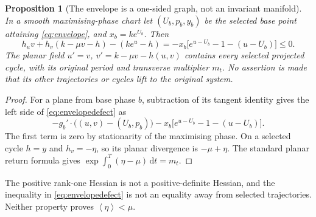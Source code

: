 \documentclass[11pt,a4paper]{article}
\numberwithin{equation}{section}
\newtheorem{proposition}[theorem]{Proposition}
\theoremstyle{remark}\newtheorem{remark}[theorem]{Remark}
\newcommand{\avg}[1]{\left\langle #1\right\rangle}
\newcommand{\dd}{\,\mathrm dt}
\begin{document}
\begin{proposition}[The envelope is a one-sided graph, not an invariant manifold]\label{prop:envelopedefect}
In a smooth maximising-phase chart let $(U_b,p_b,y_b)$ be the selected base point attaining \eqref{eq:envelope}, and $x_b=ke^{U_b}$. Then
\begin{equation}\label{eq:envelopedefect}
h_u v+h_v(k-\mu v-h)-(ke^u-h)
=-x_b\bigl[e^{u-U_b}-1-(u-U_b)\bigr]\le0.
\end{equation}
The planar field $u'=v$, $v'=k-\mu v-h(u,v)$ contains every selected projected cycle, with its original period and transverse multiplier $m_t$. No assertion is made that its other trajectories or cycles lift to the original system.
\end{proposition}
\begin{proof}
For a plane from base phase $b$, subtraction of its tangent identity gives the left side of \eqref{eq:envelopedefect} as
\[
-g_b'\cdot\bigl((u,v)-(U_b,p_b)\bigr)
-x_b\bigl[e^{u-U_b}-1-(u-U_b)\bigr].
\]
The first term is zero by stationarity of the maximising phase. On a selected cycle $h=y$ and $h_v=-\eta$, so its planar divergence is $-\mu+\eta$. The standard planar return formula gives $\exp\int_0^T(\eta-\mu)\dd=m_t$.
\end{proof}
The positive rank-one Hessian is not a positive-definite Hessian, and the inequality in \eqref{eq:envelopedefect} is not an equality away from selected trajectories. Neither property proves $\avg\eta<\mu$.
\end{document}
